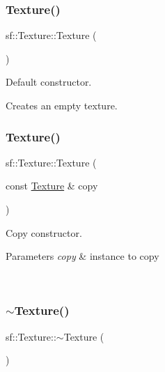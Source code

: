\subsubsection{\texorpdfstring{Texture()}{Texture()}\hspace{0.1cm}{\footnotesize\ttfamily [1/2]}}
{\footnotesize\ttfamily sf\+::\+Texture\+::\+Texture (\begin{DoxyParamCaption}{ }\end{DoxyParamCaption})}



Default constructor. 

Creates an empty texture. \begin{DoxyVerb}\end{DoxyVerb}
 \mbox{\label{classsf_1_1_texture_a524855cbf89de3b74be84d385fd229de}} 
\subsubsection{\texorpdfstring{Texture()}{Texture()}\hspace{0.1cm}{\footnotesize\ttfamily [2/2]}}
{\footnotesize\ttfamily sf\+::\+Texture\+::\+Texture (\begin{DoxyParamCaption}\item[{const \mbox{\hyperlink{classsf_1_1_texture}{Texture}} \&}]{copy }\end{DoxyParamCaption})}



Copy constructor. 


\begin{DoxyParams}{Parameters}
{\em copy} & instance to copy \begin{DoxyVerb}\end{DoxyVerb}
 \\
\hline
\end{DoxyParams}
\mbox{\label{classsf_1_1_texture_a9c5354ad40eb1c5aeeeb21f57ccd7e6c}} 
\subsubsection{\texorpdfstring{$\sim$Texture()}{~Texture()}}
{\footnotesize\ttfamily sf\+::\+Texture\+::$\sim$\+Texture (\begin{DoxyParamCaption}{ }\end{DoxyParamCaption})}



